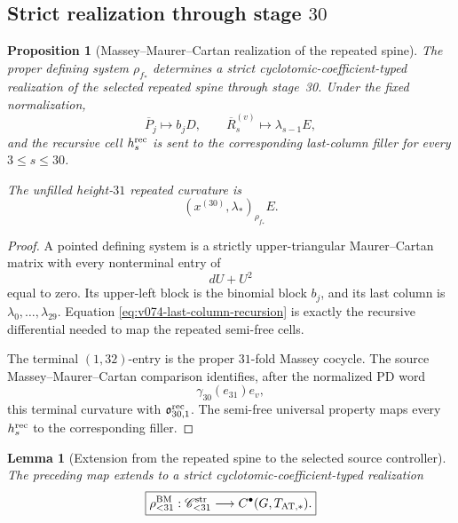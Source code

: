\documentclass[11pt]{article}
\newtheorem{proposition}[theorem]{Proposition}
\newtheorem{lemma}[theorem]{Lemma}
\theoremstyle{remark}
\begin{document}
\subsection{Strict realization through stage \texorpdfstring{\(30\)}{30}}

\begin{proposition}[Massey--Maurer--Cartan realization of the repeated spine]
\label{prop:v074-massey-mc-realization}
The proper defining system \(\rho_{f_*}\) determines a strict cyclotomic-coefficient-typed
realization of the selected repeated spine through stage~30.  Under the
fixed normalization,
\[
 \overline P_j\longmapsto b_jD,
 \qquad
 \overline R_s^{(v)}\longmapsto\lambda_{s-1}E,
\]
and the recursive cell \(h_s^{\rm rec}\) is sent to the corresponding
last-column filler for every \(3\le s\le30\).

The unfilled height-\(31\) repeated curvature is
\[
 \left(
 x^{(30)},\lambda_*
 \right)_{\rho_{f_*}}E.
\]
\end{proposition}

\begin{proof}
A pointed defining system is a strictly upper-triangular Maurer--Cartan
matrix with every nonterminal entry of
\[
 dU+U^2
\]
equal to zero.  Its upper-left block is the binomial block \(b_j\), and its
last column is \(\lambda_0,\ldots,\lambda_{29}\).
Equation \eqref{eq:v074-last-column-recursion} is exactly the recursive
differential needed to map the repeated semi-free cells.

The terminal \((1,32)\)-entry is the proper \(31\)-fold Massey cocycle.
The source Massey--Maurer--Cartan comparison identifies, after the normalized
PD word
\[
 \gamma_{30}(e_{31})e_v,
\]
this terminal curvature with
\(\mathfrak o^{\rm rec}_{30,1}\).
The semi-free universal property maps every \(h_s^{\rm rec}\) to the
corresponding filler.
\end{proof}

\begin{lemma}[Extension from the repeated spine to the selected source
controller]
\label{lem:v074-spine-to-full}
The preceding map extends to a strict cyclotomic-coefficient-typed realization
\begin{equation}
 \boxed{
 \rho_{<31}^{\rm BM}:
 \mathscr C_{<31}^{\rm str}
 \longrightarrow
 C^\bullet(G,T_{\rm AT,*}).}
 \label{eq:v074-rho-BM}
\end{equation}
\end{lemma}
\end{document}
